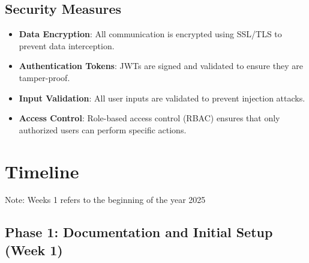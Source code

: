 \documentclass[12pt, titlepage]{article}
\begin{document}
\subsection*{Security Measures}
\begin{itemize}
  \item \textbf{Data Encryption}: All communication is encrypted using SSL/TLS to prevent data interception.
  \item \textbf{Authentication Tokens}: JWTs are signed and validated to ensure they are tamper-proof.
  \item \textbf{Input Validation}: All user inputs are validated to prevent injection attacks.
  \item \textbf{Access Control}: Role-based access control (RBAC) ensures that only authorized users can perform specific actions.
\end{itemize}

\section{Timeline}

Note: Weeks 1 refers to the beginning of the year 2025

\subsection*{Phase 1: Documentation and Initial Setup (Week 1)}
\end{document}
